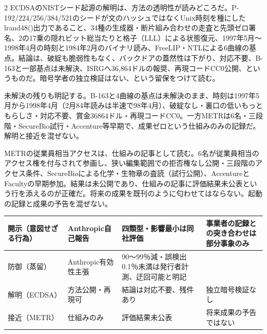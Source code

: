 \documentclass[lualatex,a4paper,10pt]{jlreq}
\begin{document}
\begin{multicols}{2}
ECDSAのNISTシード起源の解明は、方法の透明性が読みどころだ。P-192/224/256/384/521のシードが文のハッシュではなくUnix時刻を種にしたlrand48()出力であること、34種の生成器・断片組み合わせの走査と先頭ゼロ署名、2の17乗の隠れビット総当たりと格子（LLL）による状態復元、1997年5月〜1998年4月の時刻と1984年2月のバイナリ読み、FreeLIP・NTLによる6曲線の基点。結論は、破綻も脆弱性もなく、バックドアの蓋然性は下がり、対応不要、B-163と一部基点は未解決、ISRGへ36,864ドルの報奨、再現コードCC0公開、というものだ。暗号学者の独立検証はない、という留保をつけて読む。
\cite{B42,B81}


未解決の残りも明記する。B-163と4曲線の基点は未解決のまま、時刻は1997年5月から1998年4月（2月84年読みは半速で98年4月）、破綻なし・裏口の低いもっともらしさ・対応不要、賞金36864ドル・再現コードCC0。一方METRは6名・三段階・SecureBio試行・Accenture等早期で、成果ゼロという仕組みのみの記録だ。解明と接近を混ぜない。
\cite{B42,B81,B39,B82}


METRの従業員相当アクセスは、仕組みの記事として読む。6名が従業員相当のアクセス権を付与されて参画し、狭い編集範囲での拒否権なし公開・三段階のアクセス条件、SecureBioによる化学・生物章の査読（試行公開）、AccentureとFacultyの早期参加。結果は未公開であり、仕組みの記事に評価結果未公表という行を添えるのが正確だ。将来の成果を既刊のように匂わせてはならない。起動の記録と成果の予告を混ぜない。
\cite{B39,B82}


\end{multicols} %

{\centering\footnotesize
{}
\begin{tabularx}{0.96\linewidth}{@{}lXXX@{}}
\toprule
開示（意図せざる行為） & Anthropic自己報告 & 四類型・影響最小は同社評価 & 事業者の記録との突き合わせは部分事象のみ \cite{B40,B79} \\
\midrule
防御（蒸留） & Anthropic有効性主張 & 90〜99％減・誤検出0.1％未満は発行者計測、迂回可能と明記 \cite{B41,B80} \\
\midrule
解明（ECDSA） & 方法公開・再現可 & 結論は対応不要、残件あり & 独立暗号検証なし \cite{B42,B81} \\
\midrule
接近（METR） & 仕組みのみ & 評価結果未公表 & 将来成果の予告ではない \cite{B39,B82} \\
\bottomrule
\end{tabularx}
} %
\end{document}
